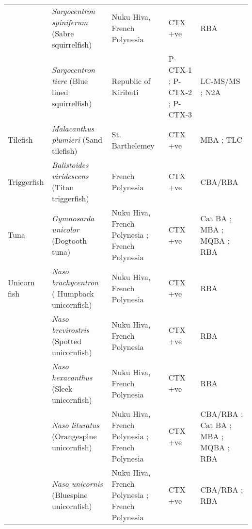 \documentclass[12pt]{article}
\begin{document}
\begin{longtable}{ | p{2cm} | p{3cm} | p{4.5cm} | p{2cm} | p{3cm} | }
	& \emph{Sargocentron spiniferum} (Sabre squirrelfish) & Nuku Hiva, French Polynesia \cite{darius2007ciguatera} & CTX +ve \cite{darius2007ciguatera} & RBA \cite{darius2007ciguatera} \\
	& \emph{Sargocentron tiere} (Blue lined squirrelfish) & Republic of Kiribati \cite{mak2013pacific} & P-CTX-1 \cite{mak2013pacific}; P-CTX-2 \cite{mak2013pacific}; P-CTX-3 \cite{mak2013pacific} & LC-MS/MS \cite{mak2013pacific}; N2A \cite{mak2013pacific} \\
	\hline
	Tilefish & \emph{Malacanthus plumieri} (Sand tilefish) & St. Barthelemey \cite{vernoux1986heterogeneity} & CTX +ve \cite{vernoux1986heterogeneity} & MBA \cite{vernoux1986heterogeneity}; TLC \cite{vernoux1986heterogeneity} \\
	\hline
	Triggerfish & \emph{Balistoides viridescens} (Titan triggerfish) & French Polynesia \cite{chinain2014mail} & CTX +ve \cite{chinain2014mail} & CBA/RBA \cite{chinain2014mail} \\
	\hline
	Tuna & \emph{Gymnosarda unicolor} (Dogtooth tuna) & Nuku Hiva, French Polynesia \cite{darius2007ciguatera}; French Polynesia \cite{bagnis1987use} & CTX +ve \cite{darius2007ciguatera,bagnis1987use} & Cat BA \cite{bagnis1987use}; MBA \cite{bagnis1987use}; MQBA \cite{bagnis1987use}; RBA \cite{darius2007ciguatera}\\
	\hline
	Unicorn fish & \emph{Naso brachycentron} ( Humpback unicornfish) & Nuku Hiva, French Polynesia \cite{darius2007ciguatera} & CTX +ve \cite{darius2007ciguatera} & RBA \cite{darius2007ciguatera} \\
	& \emph{Naso brevirostris} (Spotted unicornfish) & Nuku Hiva, French Polynesia \cite{darius2007ciguatera} & CTX +ve \cite{darius2007ciguatera} & RBA \cite{darius2007ciguatera} \\
	& \emph{Naso hexacanthus} (Sleek unicornfish) & Nuku Hiva, French Polynesia \cite{darius2007ciguatera} & CTX +ve \cite{darius2007ciguatera} & RBA \cite{darius2007ciguatera} \\
	& \emph{Naso lituratus} (Orangespine unicornfish) & Nuku Hiva, French Polynesia \cite{darius2007ciguatera}; French Polynesia \cite{chinain2014mail,bagnis1987use} & CTX +ve \cite{darius2007ciguatera,bagnis1987use,chinain2014mail} & CBA/RBA \cite{chinain2014mail}; Cat BA \cite{bagnis1987use}; MBA \cite{bagnis1987use}; MQBA \cite{bagnis1987use}; RBA \cite{darius2007ciguatera}\\
	& \emph{Naso unicornis} (Bluespine unicornfish) & Nuku Hiva, French Polynesia \cite{darius2007ciguatera}; French Polynesia \cite{chinain2014mail} & CTX +ve \cite{darius2007ciguatera,chinain2014mail} & CBA/RBA \cite{chinain2014mail}; RBA \cite{darius2007ciguatera} \\

\end{longtable}
\end{document}
